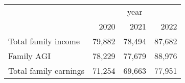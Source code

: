 \documentclass{article}
\begin{document}
\begin{tabular}{llll}
\cline{1-4}
\multicolumn{1}{c}{} &
  \multicolumn{3}{|c}{year} \\
\multicolumn{1}{c}{} &
  \multicolumn{1}{|r}{2020} &
  \multicolumn{1}{r}{2021} &
  \multicolumn{1}{r}{2022} \\
\cline{1-4}
\multicolumn{1}{l}{Total family income} &
  \multicolumn{1}{|r}{79,882} &
  \multicolumn{1}{r}{78,494} &
  \multicolumn{1}{r}{87,682} \\
\multicolumn{1}{l}{Family AGI} &
  \multicolumn{1}{|r}{78,229} &
  \multicolumn{1}{r}{77,679} &
  \multicolumn{1}{r}{88,976} \\
\multicolumn{1}{l}{Total family earnings} &
  \multicolumn{1}{|r}{71,254} &
  \multicolumn{1}{r}{69,663} &
  \multicolumn{1}{r}{77,951} \\
\cline{1-4}
\end{tabular}
\end{document}
